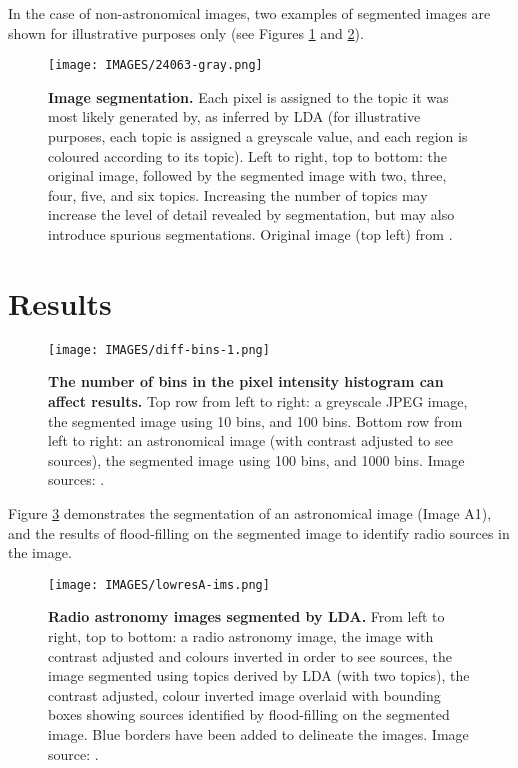 In the case of non-astronomical images, two examples of segmented images are shown for illustrative purposes only (see Figures \ref{fig:imseg} and \ref{fig:diff-bins}).

\begin{figure}
\centering
\texttt{[image: IMAGES/24063-gray.png]}
\caption[Image segmented by LDA]{\textbf{Image segmentation.} Each pixel is assigned to the topic it was most likely generated by, as inferred by LDA (for illustrative purposes, each topic is assigned a greyscale value, and each region is coloured according to its topic). Left to right, top to bottom: the original image, followed by the segmented image with two, three, four, five, and six topics. Increasing the number of topics may increase the level of detail revealed by segmentation, but may also introduce spurious segmentations. Original image (top left) from \protect\cite{martin2001database}.}
\label{fig:imseg}
\end{figure}


\section{Results}
\begin{figure}
\centering
\texttt{[image: IMAGES/diff-bins-1.png]}
\caption[The number of bins can affect results]{\textbf{The number of bins in the pixel intensity histogram can affect results.} Top row from left to right: a greyscale JPEG image, the segmented image using 10 bins, and 100 bins. Bottom row from left to right: an astronomical image (with contrast adjusted to see sources), the segmented image using 100 bins, and 1000 bins. Image sources: \protect\cite{karimZebra,saripalli2012atlbs,subrahmanyan2010atlbs}.}
\label{fig:diff-bins}
\end{figure}

Figure \ref{fig:lowresA} demonstrates the segmentation of an astronomical image (Image A1), and the results of flood-filling on the segmented image to identify radio sources in the image.

\begin{figure}
\centering
\texttt{[image: IMAGES/lowresA-ims.png]}
\caption[Radio astronomy images segmented by LDA]{\textbf{Radio astronomy images segmented by LDA.} From left to right, top to bottom: a radio astronomy image, the image with contrast adjusted and colours inverted in order to see sources, the image segmented using topics derived by LDA (with two topics), the contrast adjusted, colour inverted image overlaid with bounding boxes showing sources identified by flood-filling on the segmented image. Blue borders have been added to delineate the images. Image source: \protect\cite{saripalli2012atlbs,subrahmanyan2010atlbs}.}
\label{fig:lowresA}
\end{figure} 

